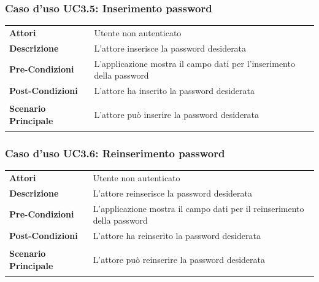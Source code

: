 \subsubsection{Caso d'uso UC3.5: Inserimento password}
\label{UC3_5}

\begin{longtable}{ l | p{11cm}}
	\hline
	\rowcolor{Gray}
	 \multicolumn{2}{c}{UC3.5 - Inserimento password} \\
	 \hline
	\textbf{Attori} & Utente non autenticato \\
	\textbf{Descrizione} & L'attore inserisce la password desiderata  \\
	\textbf{Pre-Condizioni} & L'applicazione mostra il campo dati per l'inserimento della password \\
	\textbf{Post-Condizioni} & L'attore ha inserito la password desiderata \\
	\textbf{Scenario Principale} & 
	\begin{enumerate*}[label=(\arabic*.),itemjoin={\newline}]
		\item L'attore può inserire la password desiderata
	\end{enumerate*}\\
\end{longtable}

\subsubsection{Caso d'uso UC3.6: Reinserimento password}
\label{UC3_6}

\begin{longtable}{ l | p{11cm}}
	\hline
	\rowcolor{Gray}
	 \multicolumn{2}{c}{UC3.6 - Reinserimento password} \\
	 \hline
	\textbf{Attori} & Utente non autenticato \\
	\textbf{Descrizione} & L'attore reinserisce la password desiderata  \\
	\textbf{Pre-Condizioni} & L'applicazione mostra il campo dati per il reinserimento della password \\
	\textbf{Post-Condizioni} & L'attore ha reinserito la password desiderata \\
	\textbf{Scenario Principale} & 
	\begin{enumerate*}[label=(\arabic*.),itemjoin={\newline}]
		\item L'attore può reinserire la password desiderata
	\end{enumerate*}\\
\end{longtable}

